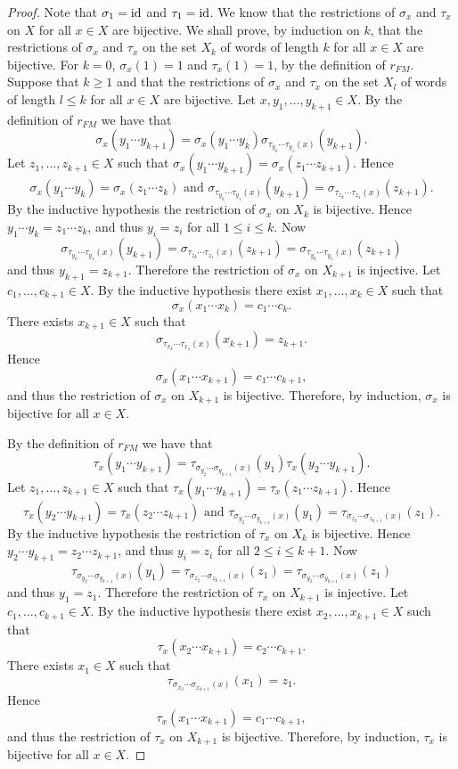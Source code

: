 \begin{proof}
Note that $\sigma_1=\operatorname{id}$ and $\tau_1=\operatorname{id}$. We know that the restrictions of $\sigma_x$ and $\tau_x$ on $X$ for all $x\in X$ are bijective.
We shall prove, by induction on $k$, that the restrictions of $\sigma_x$ and $\tau_x$ on the set $X_k$ of words of length $k$ for all $x\in X$ are bijective. For $k=0$, $\sigma_x(1)=1$ and $\tau_x(1)=1$, by the definition of $r_{FM}$. Suppose that $k\geq 1$ and that the restrictions of $\sigma_x$ and $\tau_x$ on the set $X_l$ of words of length $l\leq k$ for all $x\in X$ are bijective. Let $x,y_1,\dots ,y_{k+1}\in X$. By the definition of $r_{FM}$ we have that
\[\sigma_x(y_1\cdots y_{k+1})=\sigma_x(y_1\cdots y_k)\sigma_{\tau_{y_k}\cdots \tau_{y_1}(x)}(y_{k+1}).\]
Let $z_1,\dots,z_{k+1}\in X$  such that $\sigma_x(y_1\cdots y_{k+1})=\sigma_x(z_1\cdots z_{k+1})$. Hence
\[\sigma_x(y_1\cdots y_{k})=\sigma_x(z_1\cdots z_{k}) \text{ and }
\sigma_{\tau_{y_k}\cdots \tau_{y_1}(x)}(y_{k+1})=\sigma_{\tau_{z_k}\cdots \tau_{z_1}(x)}(z_{k+1}).\]
By the inductive hypothesis the restriction of $\sigma_x$ on $X_k$ is bijective. Hence $y_1\cdots y_k=z_1\cdots z_k$, and thus $y_i=z_i$ for all $1\leq i\leq k$. Now
\[\sigma_{\tau_{y_k}\cdots \tau_{y_1}(x)}(y_{k+1})=\sigma_{\tau_{z_k}\cdots \tau_{z_1}(x)}(z_{k+1})=\sigma_{\tau_{y_k}\cdots \tau_{y_1}(x)}(z_{k+1})\]
and thus $y_{k+1}=z_{k+1}$. Therefore the restriction of $\sigma_x$ on $X_{k+1}$ is injective. Let $c_1,\dots ,c_{k+1}\in X$. By the inductive hypothesis there exist $x_1,\dots ,x_k\in X$ such that
\[\sigma_x(x_1\cdots x_k)=c_1\cdots c_k.\]
There exists $x_{k+1}\in X$ such that
\[\sigma_{\tau_{x_k}\cdots \tau_{x_1}(x)}(x_{k+1})=z_{k+1}.\]
Hence
\[\sigma_x(x_1\cdots x_{k+1})=c_1\cdots c_{k+1},\]
and thus the restriction of $\sigma_x$ on $X_{k+1}$ is bijective.
Therefore, by induction, $\sigma_x$ is bijective for all $x\in X$.

By the definition of $r_{FM}$ we have that
\[\tau_x(y_1\cdots y_{k+1})=\tau_{\sigma_{y_2}\cdots \sigma_{y_{k+1}}(x)}(y_{1})\tau_x(y_2\cdots y_{k+1}).\]
Let $z_1,\dots,z_{k+1}\in X$  such that $\tau_x(y_1\cdots y_{k+1})=\tau_x(z_1\cdots z_{k+1})$. Hence
\[\tau_x(y_2\cdots y_{k+1})=\tau_x(z_2\cdots z_{k+1}) \text{ and }
\tau_{\sigma_{y_2}\cdots \sigma_{y_{k+1}}(x)}(y_{1})=\tau_{\sigma_{z_2}\cdots \sigma_{z_{k+1}}(x)}(z_{1}).\]
By the inductive hypothesis the restriction of $\tau_x$ on $X_k$ is bijective. Hence $y_2\cdots y_{k+1}=z_2\cdots z_{k+1}$, and thus $y_i=z_i$ for all $2\leq i\leq k+1$. Now
\[\tau_{\sigma_{y_2}\cdots \sigma_{y_{k+1}}(x)}(y_{1})=\tau_{\sigma_{z_2}\cdots \sigma_{z_{k+1}}(x)}(z_{1})=\tau_{\sigma_{y_2}\cdots \sigma_{y_{k+1}}(x)}(z_{1})\]
and thus $y_{1}=z_{1}$. Therefore the restriction of $\tau_x$ on $X_{k+1}$ is injective. Let $c_1,\dots ,c_{k+1}\in X$. By the inductive hypothesis there exist $x_2,\dots ,x_{k+1}\in X$ such that
\[\tau_x(x_2\cdots x_{k+1})=c_2\cdots c_{k+1}.\]
There exists $x_{1}\in X$ such that
\[\tau_{\sigma_{x_2}\cdots \sigma_{x_{k+1}}(x)}(x_{1})=z_{1}.\]
Hence
\[\tau_x(x_1\cdots x_{k+1})=c_1\cdots c_{k+1},\]
and thus the restriction of $\tau_x$ on $X_{k+1}$ is bijective.
Therefore, by induction, $\tau_x$ is bijective for all $x\in X$.


\end{proof}
